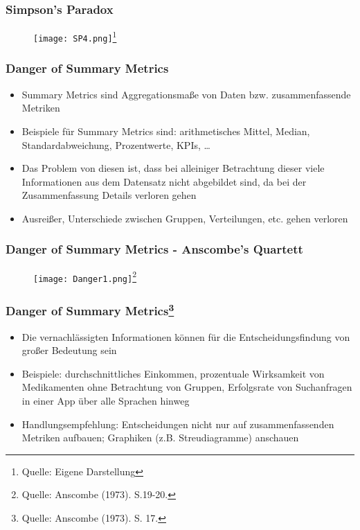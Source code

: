 \documentclass{beamer}
\begin{document}
\begin{frame}
\frametitle{Simpson's Paradox}

\begin{figure}
    \centering
    \texttt{[image: SP4.png]}\footnote{Quelle: {Eigene Darstellung}}
    
\end{figure}

\end{frame}

\begin{frame}
\frametitle{Danger of Summary Metrics}
\begin{itemize}
    \item Summary Metrics sind Aggregationsmaße von Daten bzw. zusammenfassende Metriken
    \item Beispiele für Summary Metrics sind: arithmetisches Mittel, Median, Standardabweichung, Prozentwerte, KPIs, …
    \item Das Problem von diesen ist, dass bei alleiniger Betrachtung dieser viele Informationen aus dem Datensatz nicht abgebildet sind, da bei der Zusammenfassung Details verloren gehen
    \item Ausreißer, Unterschiede zwischen Gruppen, Verteilungen, etc. gehen verloren
\end{itemize}
\end{frame}

\begin{frame}
\frametitle{Danger of Summary Metrics - Anscombe’s Quartett}

\begin{figure}
    \centering
    \texttt{[image: Danger1.png]}\footnote{Quelle: {Anscombe (1973). S.19-20.}}
    
\end{figure}

\end{frame}

\begin{frame}
\frametitle{Danger of Summary Metrics\footnote{Quelle: {Anscombe (1973). S. 17.}}}
\begin{itemize}
    \item Die vernachlässigten Informationen können für die Entscheidungsfindung von großer Bedeutung sein
    \item Beispiele: durchschnittliches Einkommen, prozentuale Wirksamkeit von Medikamenten ohne Betrachtung von Gruppen, Erfolgsrate von Suchanfragen in einer App über alle Sprachen hinweg
    \item Handlungsempfehlung: Entscheidungen nicht nur auf zusammenfassenden Metriken aufbauen; Graphiken (z.B. Streudiagramme) anschauen
\end{itemize}
\end{frame}
\end{document}
